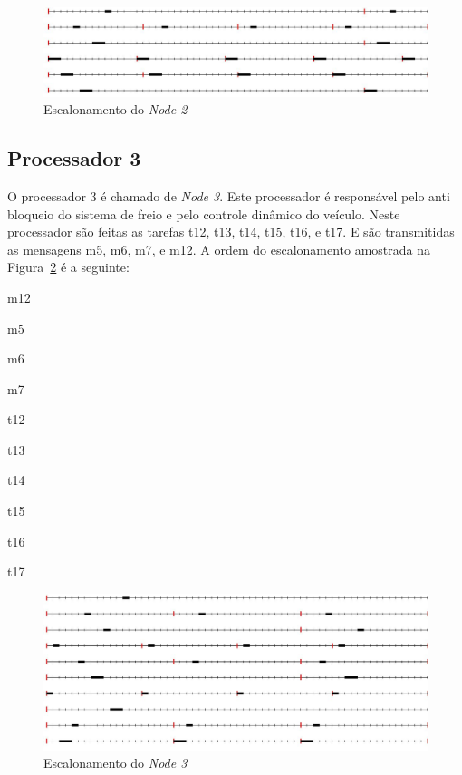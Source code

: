 \documentclass[12pt]{article}
\begin{document}
\begin{figure}[ht]
	\centering
	\includegraphics[width=1\textwidth]{node2.jpg}
    \caption{Escalonamento do \textit{Node 2}}
	\label{node2}
\end{figure}

\subsection{Processador 3}

O processador 3 é chamado de \textit{Node 3}. Este processador é responsável pelo anti bloqueio do sistema de freio e pelo controle dinâmico do veículo. Neste processador são feitas as tarefas t12, t13, t14, t15, t16, e t17. E são transmitidas as mensagens m5, m6, m7, e m12. 
A ordem do escalonamento amostrada na Figura~\ref{node3} é a seguinte:

\begin{enumerate}
    \begin{horizlist}{4}{1cm}
    \item m12
    \item m5
    \item m6
    \item m7
    \item t12
    \item t13
    \item t14
    \item t15
    \item t16
    \item t17
    \end{horizlist}
\end{enumerate}

\newpage{}

\begin{figure}[ht]
	\centering
	\includegraphics[width=1\textwidth]{node3.jpg}
    \caption{Escalonamento do \textit{Node 3}}
	\label{node3}
\end{figure}
\end{document}

